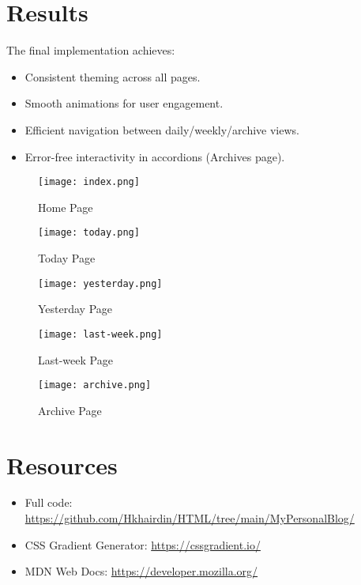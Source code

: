 \documentclass[a4paper,12pt]{article}
\begin{document}
\section{Results}
The final implementation achieves:
\begin{itemize}
    \item Consistent theming across all pages.
    \item Smooth animations for user engagement.
    \item Efficient navigation between daily/weekly/archive views.
    \item Error-free interactivity in accordions (Archives page).
\end{itemize}

\begin{figure}[H]
\centering
\texttt{[image: index.png]}
\caption{Home Page}
\label{fig:index}
\end{figure}
\begin{figure}[H]
\centering
\texttt{[image: today.png]}
\caption{Today Page}
\label{fig:today}
\end{figure}
\begin{figure}[H]
\centering
\texttt{[image: yesterday.png]}
\caption{Yesterday Page}
\label{fig:yesterday}
\end{figure}
\begin{figure}[H]
\centering
\texttt{[image: last-week.png]}
\caption{Last-week Page}
\label{fig:last-week}
\end{figure}
\begin{figure}[H]
\centering
\texttt{[image: archive.png]}
\caption{Archive Page}
\label{fig:archive}
\end{figure}

\section{Resources}
\begin{itemize}
    \item Full code: \url{https://github.com/Hkhairdin/HTML/tree/main/MyPersonalBlog/}
    \item CSS Gradient Generator: \url{https://cssgradient.io/}
    \item MDN Web Docs: \url{https://developer.mozilla.org/}
\end{itemize}
\end{document}
